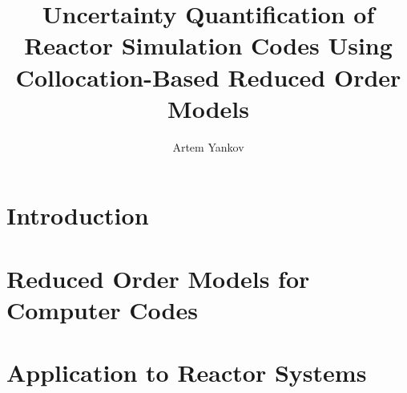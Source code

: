 \documentclass[thesis]{thesis-umich}
\title{Uncertainty Quantification of Reactor Simulation Codes Using Collocation-Based Reduced Order Models}
\author{Artem Yankov}
\begin{document}
\chapter{Introduction}   \label{chap:intro}



\chapter{Reduced Order Models for Computer Codes} \label{chap:rom}


\chapter{Application to Reactor Systems} \label{chap:applications}




\end{document}
